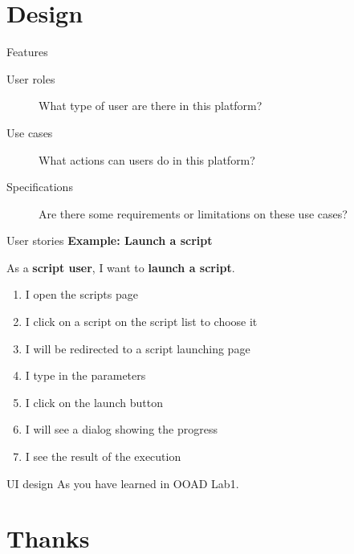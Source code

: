 \documentclass[aspectratio=169]{beamer}
\begin{document}
	\section{Design}
	\begin{frame}{Features}
		\begin{description}
			\item[User roles] What type of user are there in this platform?
			\item[Use cases] What actions can users do in this platform?
			\item[Specifications] Are there some requirements or limitations on these use cases?
		\end{description}
	\end{frame}
	\begin{frame}{User stories}
		\large \textbf{Example: Launch a script}
		
		\normalsize
		\bigskip
		As a \textbf{script user}, I want to \textbf{launch a script}.
		\begin{enumerate}
			\item I open the scripts page
			\item I click on a script on the script list to choose it
			\item I will be redirected to a script launching page
			\item I type in the parameters
			\item I click on the launch button
			\item I will see a dialog showing the progress
			\item I see the result of the execution
		\end{enumerate}
	\end{frame}
	\begin{frame}{UI design}
		\LARGE As you have learned in OOAD Lab1.
	\end{frame}
	
	\section{Thanks}
\end{document}
